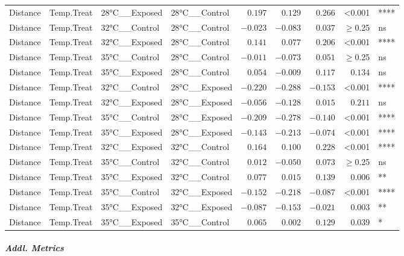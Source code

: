 \documentclass[
]{article}
\begin{document}
\begin{longtable}{llllrrrrl}
\midrule\addlinespace[2.5pt]
Distance & Temp.Treat & 28°C\_\_Exposed & 28°C\_\_Control & $0.197$ & $0.129$ & $0.266$ & <0.001 & **** \\ 
Distance & Temp.Treat & 32°C\_\_Control & 28°C\_\_Control & $-0.023$ & $-0.083$ & $0.037$ & $\geq$0.25 & ns \\ 
Distance & Temp.Treat & 32°C\_\_Exposed & 28°C\_\_Control & $0.141$ & $0.077$ & $0.206$ & <0.001 & **** \\ 
Distance & Temp.Treat & 35°C\_\_Control & 28°C\_\_Control & $-0.011$ & $-0.073$ & $0.051$ & $\geq$0.25 & ns \\ 
Distance & Temp.Treat & 35°C\_\_Exposed & 28°C\_\_Control & $0.054$ & $-0.009$ & $0.117$ & $0.134$ & ns \\ 
Distance & Temp.Treat & 32°C\_\_Control & 28°C\_\_Exposed & $-0.220$ & $-0.288$ & $-0.153$ & <0.001 & **** \\ 
Distance & Temp.Treat & 32°C\_\_Exposed & 28°C\_\_Exposed & $-0.056$ & $-0.128$ & $0.015$ & $0.211$ & ns \\ 
Distance & Temp.Treat & 35°C\_\_Control & 28°C\_\_Exposed & $-0.209$ & $-0.278$ & $-0.140$ & <0.001 & **** \\ 
Distance & Temp.Treat & 35°C\_\_Exposed & 28°C\_\_Exposed & $-0.143$ & $-0.213$ & $-0.074$ & <0.001 & **** \\ 
Distance & Temp.Treat & 32°C\_\_Exposed & 32°C\_\_Control & $0.164$ & $0.100$ & $0.228$ & <0.001 & **** \\ 
Distance & Temp.Treat & 35°C\_\_Control & 32°C\_\_Control & $0.012$ & $-0.050$ & $0.073$ & $\geq$0.25 & ns \\ 
Distance & Temp.Treat & 35°C\_\_Exposed & 32°C\_\_Control & $0.077$ & $0.015$ & $0.139$ & $0.006$ & ** \\ 
Distance & Temp.Treat & 35°C\_\_Control & 32°C\_\_Exposed & $-0.152$ & $-0.218$ & $-0.087$ & <0.001 & **** \\ 
Distance & Temp.Treat & 35°C\_\_Exposed & 32°C\_\_Exposed & $-0.087$ & $-0.153$ & $-0.021$ & $0.003$ & ** \\ 
Distance & Temp.Treat & 35°C\_\_Exposed & 35°C\_\_Control & $0.065$ & $0.002$ & $0.129$ & $0.039$ & * \\ 
\bottomrule
\end{longtable}

\subparagraph{Addl. Metrics}\label{addl.-metrics-15}

\subsubsection{}\label{section-5}
\end{document}
